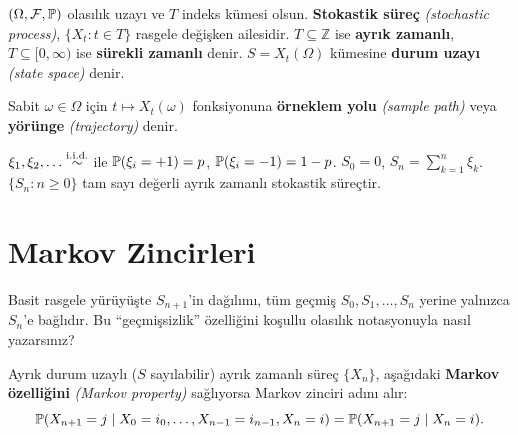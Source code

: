 \begin{tanim}\label{def:stokastik_surec}
$(\Omega,\mathcal{F},\mathbb{P})$ olasılık uzayı ve $T$ indeks kümesi olsun. \textbf{Stokastik süreç} \emph{(stochastic process)}, $\{X_t : t\in T\}$ rasgele değişken ailesidir. $T\subseteq\mathbb{Z}$ ise \textbf{ayrık zamanlı}, $T\subseteq[0,\infty)$ ise \textbf{sürekli zamanlı} denir. $S = X_t(\Omega)$ kümesine \textbf{durum uzayı} \emph{(state space)} denir.
\end{tanim}

\begin{tanim}\label{def:orneklem_yolu}
Sabit $\omega\in\Omega$ için $t\mapsto X_t(\omega)$ fonksiyonuna \textbf{örneklem yolu} \emph{(sample path)} veya \textbf{yörünge} \emph{(trajectory)} denir.
\end{tanim}

\begin{ornek}\label{ex:basit_yuruyus}
$\xi_1,\xi_2,\ldots\overset{\text{i.i.d.}}{\sim}$ ile $\mathbb{P}(\xi_i=+1)=p$, $\mathbb{P}(\xi_i=-1)=1-p$. $S_0=0$, $S_n=\sum_{k=1}^n\xi_k$. $\{S_n:n\geq0\}$ tam sayı değerli ayrık zamanlı stokastik süreçtir.
\end{ornek}

\section{Markov Zincirleri}
\label{sec:markov_zincirleri}

\begin{kesif}
Basit rasgele yürüyüşte $S_{n+1}$'in dağılımı, tüm geçmiş $S_0,S_1,\ldots,S_n$
yerine yalnızca $S_n$'e bağlıdır. Bu ``geçmişsizlik'' özelliğini koşullu
olasılık notasyonuyla nasıl yazarsınız?
\end{kesif}

\begin{tanim}\label{def:markov_zinciri}
Ayrık durum uzaylı ($S$ sayılabilir) ayrık zamanlı süreç $\{X_n\}$, aşağıdaki \textbf{Markov özelliğini} \emph{(Markov property)} sağlıyorsa Markov zinciri adını alır:
\[
  \mathbb{P}(X_{n+1}=j \mid X_0=i_0,\ldots,X_{n-1}=i_{n-1},X_n=i)
  = \mathbb{P}(X_{n+1}=j\mid X_n=i).
\]
\end{tanim}

